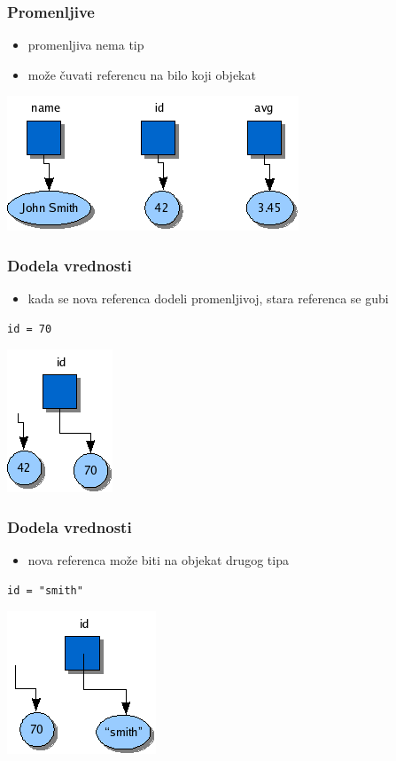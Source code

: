 \documentclass[compress]{beamer}
\begin{document}
\begin{frame}[fragile]
\frametitle{Promenljive}
\begin{itemize}
  \item promenljiva nema tip
  \item može čuvati referencu na bilo koji objekat
\end{itemize}
\begin{center}
\includegraphics[scale=0.7]{variables.png}
\end{center}
\end{frame}
    
\begin{frame}[fragile]
\frametitle{Dodela vrednosti}
\begin{itemize}
  \item kada se nova referenca dodeli promenljivoj, stara referenca se gubi
\end{itemize}
\begin{verbatim}
id = 70
\end{verbatim}
\begin{center}
\includegraphics[scale=0.7]{newref.png}
\end{center}
\end{frame}
  
\begin{frame}[fragile]
\frametitle{Dodela vrednosti}
\begin{itemize}
  \item nova referenca može biti na objekat drugog tipa
\end{itemize}
\begin{verbatim}
id = "smith"
\end{verbatim}
\begin{center}
\includegraphics[scale=0.7]{diffref.png}
\end{center}
\end{frame}
  
\end{document}
